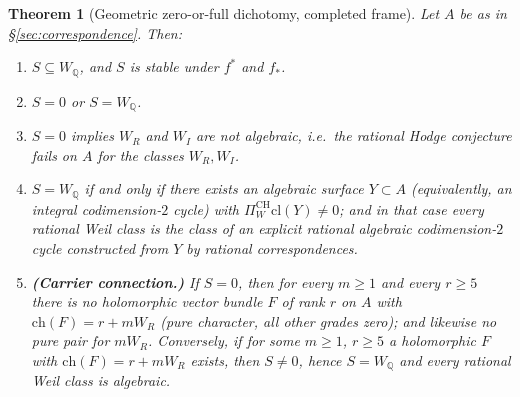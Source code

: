 \documentclass[11pt]{article}
\newtheorem{theorem}{Theorem}
\begin{document}
\begin{theorem}[Geometric zero-or-full dichotomy, completed frame]\label{thm:W1}
Let $A$ be as in \S\ref{sec:correspondence}. Then:
\begin{enumerate}[label=(\roman*)]
\item $S\subseteq W_{\mathbb{Q}}$, and $S$ is stable under $f^{*}$ and $f_{*}$.
\item $S=0$ or $S=W_{\mathbb{Q}}$.
\item $S=0$ implies $W_R$ and $W_I$ are not algebraic, i.e.\ the rational Hodge conjecture fails on $A$
for the classes $W_R,W_I$.
\item $S=W_{\mathbb{Q}}$ if and only if there exists an algebraic surface $Y\subset A$ (equivalently, an integral
codimension-$2$ cycle) with $\Pi_W^{\mathrm{CH}}\mathrm{cl}(Y)\ne 0$; and in that case \emph{every} rational Weil
class is the class of an explicit rational algebraic codimension-$2$ cycle constructed from $Y$ by rational
correspondences.
\item \textbf{(Carrier connection.)} If $S=0$, then for \emph{every} $m\ge 1$ and \emph{every} $r\ge 5$ there is
\emph{no} holomorphic vector bundle $F$ of rank $r$ on $A$ with
$\mathrm{ch}(F)=r+mW_R$ (pure character, all other grades zero); and likewise no pure pair for $mW_R$.
Conversely, if for \emph{some} $m\ge1$, $r\ge5$ a holomorphic $F$ with $\mathrm{ch}(F)=r+mW_R$ exists, then
$S\ne0$, hence $S=W_{\mathbb{Q}}$ and every rational Weil class is algebraic.
\end{enumerate}
\end{theorem}
\end{document}
